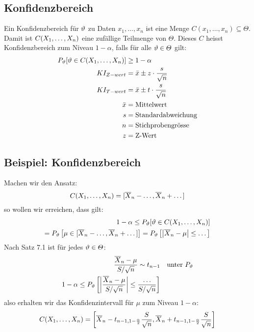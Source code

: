 \subsection{Konfidenzbereich}
Ein Konfidenzbereich für $\vartheta$ zu Daten $x_1, \dots, x_n$ ist eine Menge $C
  (x_1, \dots, x_n) \subseteq \varTheta$. Damit ist $C (X_1, \dots, X_n)$ eine
zufällige Teilmenge von $\varTheta$. Dieses $C$ heisst Konfidenzbereich zum
Niveau $1 - \alpha$, falls für alle $\vartheta \in \varTheta$ gilt:
\begin{align*}
  P_\vartheta [\vartheta \in C (X_1, \dots, X_n)] &\geq 1 - \alpha\\
  KI_{Z-wert} &= \bar{x} \pm z \cdot \frac{s}{\sqrt{n}}\\
  KI_{T-wert} &= \bar{x} \pm t \cdot \frac{s}{\sqrt{n}}\\
  \bar{x} &= \text{Mittelwert}\\
  s &= \text{Standardabweichung}\\
  n &= \text{Stichprobengrösse}\\
  z &= \text{Z-Wert}\\
\end{align*}

\BoxStart{}
\subsection{Beispiel: Konfidenzbereich}
Machen wir den Ansatz:
\begin{align*}
  C (X_1, \dots, X_n) = [\overline{X}_n - \dots, \overline{X}_n + \dots]
\end{align*}
so wollen wir erreichen, dass gilt:
\begin{align*}
  1 - \alpha \leq P_\vartheta[\vartheta \in  C (X_1, \dots, X_n)] \\
  = P_\vartheta \left[ \mu \in [\overline{X}_n - \dots, \overline{X}_n + \dots] \right]
  = P_\vartheta \left[ \abs{\overline{X}_n - \mu} \leq \dots \right]
\end{align*}
Nach Satz 7.1 ist für jedes $\vartheta \in \varTheta$:
\begin{align*}
  \frac{\overline{X}_n - \mu}{S / \sqrt{n}} \sim t_{n-1} &  & \text{unter } P_\vartheta \\
  1 - \alpha \leq P_\vartheta \left[ \abs{\frac{\overline{X}_n - \mu}{S / \sqrt{n}}} \leq \frac{\dots}{S / \sqrt{n}} \right]
\end{align*}
also erhalten wir das Konfidenzintervall für $\mu$ zum Niveau $1 - \alpha$:
\begin{align*}
  C (X_1, \dots, X_n) = \left[ \overline{X}_n - t_{n-1, 1 - \frac{\alpha}{2}} \frac{S}{\sqrt{n}}, \overline{X}_n + t_{n-1, 1 - \frac{\alpha}{2}} \frac{S}{\sqrt{n}} \right]
\end{align*}
\BoxEnd{}

